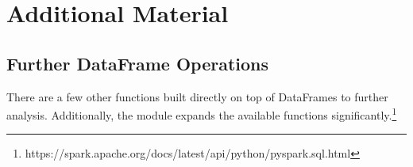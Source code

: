 
\newpage

\section*{Additional Material} %

\subsection*{Further DataFrame Operations}

There are a few other functions built directly on top of DataFrames to further analysis.
Additionally, the  module expands the available functions significantly.\footnote{https://spark.apache.org/docs/latest/api/python/pyspark.sql.html}

